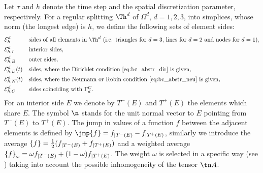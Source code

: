 Let $\tau$ and $h$ denote the time step and the spatial discretization parameter, respectively.
For a regular splitting $\Th^d$ of $\Omega^d$, $d=1,2,3$, into simplices,
 whose norm (the longest edge) is $h$, we define the following sets of element sides:
\begin{align*}
 &\Eh^d &&\mbox{sides of all elements in $\Th^d$ (i.e. triangles for $d=3$, lines for $d=2$ and nodes for $d=1$)},\\
 &\Ehint^d &&\mbox{interior sides},\\
 &\Ehb^d &&\mbox{outer sides},\\
 &\Ehdir^d(t) &&\mbox{sides, where the Dirichlet condition \eqref{eq:bc_abstr_dir} is given},\\
 &\Ehneu^d(t) &&\mbox{sides, where the Neumann or Robin condition \eqref{eq:bc_abstr_neu} is given},\\
 &\Ehcom^d &&\mbox{sides coinciding with $\Gamma^C_d$}.
\end{align*}
For an interior side $E$ we denote by $T^-(E)$ and $T^+(E)$ the elements which share $E$.
The symbol $\n$ stands for the unit normal vector to $E$ pointing from $T^-(E)$ to $T^+(E)$.
The jump in values of a function $f$ between the adjacent elements is defined by $\jmp{f}=f_{|T^-(E)}-f_{|T^+(E)}$,
 similarly we introduce the average $\left\{f\right\}=\frac12(f_{|T^-(E)} + f_{|T^+(E)})$
 and a weighted average $\left\{f\right\}_{\omega}=\omega f_{|T^-(E)} + (1-\omega) f_{|T^+(E)}$.
The weight $\omega$ is selected in a specific way (see \cite{ern_stephansen_zunino})
 taking into account the possible inhomogeneity of the tensor $\tn A$.

